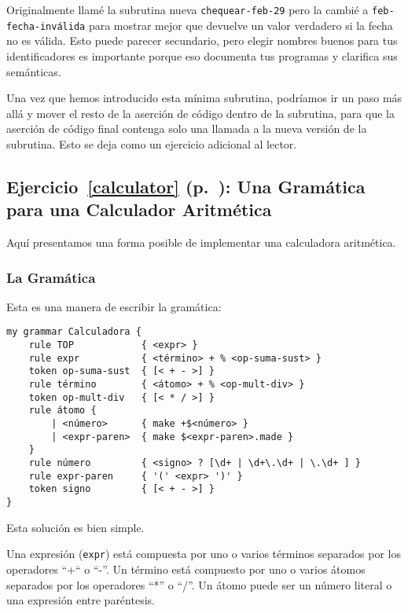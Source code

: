 Originalmente llamé la subrutina nueva {\tt chequear-feb-29}
pero la cambié a {\tt feb-fecha-inválida} para mostrar mejor
que devuelve un valor verdadero si la fecha no es válida. 
Esto puede parecer secundario, pero elegir nombres buenos 
para tus identificadores es importante porque eso documenta 
tus programas y clarifica sus semánticas.

Una vez que hemos introducido esta mínima subrutina, podríamos
ir un paso más allá y mover el resto de la aserción de código
dentro de la subrutina, para que la aserción de código final
contenga solo una llamada a la nueva versión de la subrutina.
Esto se deja como un ejercicio adicional al lector.

\subsection{Ejercicio~\ref{calculator} (p.~\pageref{calculator}): 
Una Gramática para una Calculador Aritmética}
\label{sol_calculator}

Aquí presentamos una forma posible de implementar una calculadora
aritmética.

\subsubsection{La Gramática}

Esta es una manera de escribir la gramática:

\begin{verbatim}
my grammar Calculadora {
    rule TOP            { <expr> }
    rule expr           { <término> + % <op-suma-sust> }
    token op-suma-sust  { [< + - >] }
    rule término        { <átomo> + % <op-mult-div> }
    token op-mult-div   { [< * / >] }
    rule átomo {
        | <número>      { make +$<número> }
        | <expr-paren>  { make $<expr-paren>.made }
    }
    rule número         { <signo> ? [\d+ | \d+\.\d+ | \.\d+ ] }
    rule expr-paren     { '(' <expr> ')' }
    token signo         { [< + - >] }
}
\end{verbatim}

Esta solución es bien simple.

Una expresión (\verb|expr|) está compuesta por uno o varios
términos separados por los operadores ``+`` o ``-''. Un término
está compuesto por uno o varios átomos separados por los
operadores ``*'' o ``/''. Un átomo puede ser un número literal
o una expresión entre paréntesis.

